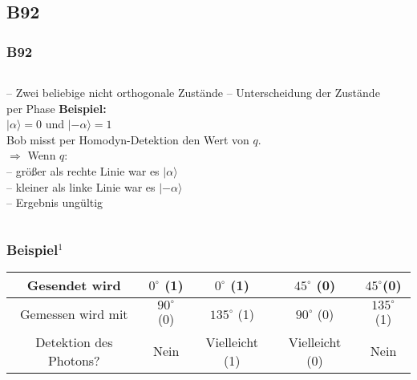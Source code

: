 \subsection{B92}
\begin{frame}
	\frametitle{B92}
	\begin{columns}
		\begin{column}{0.6\linewidth}
			-- Zwei beliebige nicht orthogonale Zustände 
			-- Unterscheidung der Zustände per Phase
			\hspace{0.5em}
			\textbf{Beispiel:}\\
			$|\alpha\rangle = 0$ und $|-\alpha\rangle = 1$\\
			Bob misst per Homodyn-Detektion den Wert von $q$.\\
			$\Rightarrow$ Wenn $q$:\\
			\hspace{0.5em}-- größer als rechte Linie war es $|\alpha\rangle$\\
			\hspace{0.5em}-- kleiner als linke Linie war es $|-\alpha\rangle$\\
			\hspace{0.5em}-- Ergebnis ungültig
		\end{column}
		\begin{column}{0.39\linewidth}
		\end{column}
	\end{columns}
\end{frame}

\begin{frame}
	\frametitle{Beispiel$^{1}$}
	\begin{tabular}{|c|c|c|c|c|}
		\hline
		Gesendet wird & $0^{\circ}$ (1) & $0^{\circ}$ (1) & $45^{\circ}$ (0) & $45^{\circ}$(0) \\
		\hline
		Gemessen wird mit & $90^{\circ}$ (0) & $135^{\circ}$ (1) & $90^{\circ}$ (0) & $135^{\circ}$ (1) \\
		\hline
		Detektion des Photons? & Nein & Vielleicht (1) & Vielleicht (0) & Nein \\
		\hline
	\end{tabular}
\end{frame}